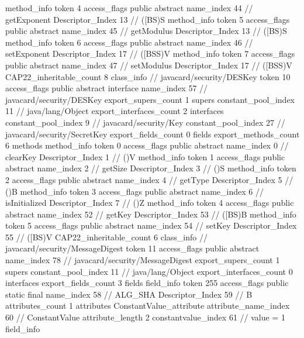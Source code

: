 {{{{{				}
				method_info {
					token	4
					access_flags	public abstract
					name_index	44		// getExponent
					Descriptor_Index	13		// ([BS)S
				}
				method_info {
					token	5
					access_flags	public abstract
					name_index	45		// getModulus
					Descriptor_Index	13		// ([BS)S
				}
				method_info {
					token	6
					access_flags	public abstract
					name_index	46		// setExponent
					Descriptor_Index	17		// ([BSS)V
				}
				method_info {
					token	7
					access_flags	public abstract
					name_index	47		// setModulus
					Descriptor_Index	17		// ([BSS)V
				}
			}
			CAP22_inheritable_count	8
		}
		class_info {		// javacard/security/DESKey
			token	10
			access_flags	public abstract interface
			name_index	57		// javacard/security/DESKey
			export_supers_count	1
			supers {
				constant_pool_index	11		// java/lang/Object
			}
			export_interfaces_count	2
			interfaces {
				constant_pool_index	9		// javacard/security/Key
				constant_pool_index	27		// javacard/security/SecretKey
			}
			export_fields_count	0
			fields {
			}
			export_methods_count	6
			methods {
				method_info {
					token	0
					access_flags	public abstract
					name_index	0		// clearKey
					Descriptor_Index	1		// ()V
				}
				method_info {
					token	1
					access_flags	public abstract
					name_index	2		// getSize
					Descriptor_Index	3		// ()S
				}
				method_info {
					token	2
					access_flags	public abstract
					name_index	4		// getType
					Descriptor_Index	5		// ()B
				}
				method_info {
					token	3
					access_flags	public abstract
					name_index	6		// isInitialized
					Descriptor_Index	7		// ()Z
				}
				method_info {
					token	4
					access_flags	public abstract
					name_index	52		// getKey
					Descriptor_Index	53		// ([BS)B
				}
				method_info {
					token	5
					access_flags	public abstract
					name_index	54		// setKey
					Descriptor_Index	55		// ([BS)V
				}
			}
			CAP22_inheritable_count	6
		}
		class_info {		// javacard/security/MessageDigest
			token	11
			access_flags	public abstract
			name_index	78		// javacard/security/MessageDigest
			export_supers_count	1
			supers {
				constant_pool_index	11		// java/lang/Object
			}
			export_interfaces_count	0
			interfaces {
			}
			export_fields_count	3
			fields {
			field_info {
				token	255
				access_flags	public static final
				name_index	58		// ALG_SHA
				Descriptor_Index	59		// B
				attributes_count	1
				attributes {
				ConstantValue_attribute {
					attribute_name_index	60		// ConstantValue
					attribute_length	2
					constantvalue_index	61		// value = 1
				}
				}
			}
			field_info {
}}}}}
